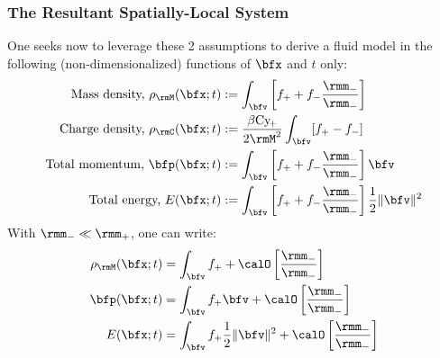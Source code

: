 \subsubsection*{The Resultant Spatially-Local System}
    One seeks now to leverage these 2 assumptions to derive a fluid model in the following (non-dimensionalized) functions of $\bfx$ and $t$ only:
    \begin{align}
        \text{Mass density, }   \rho_{\rmM}(\bfx; t)  &:=  \int_{\bfv}\left[f_{+} + f_{-}\frac{\rmm_{-}}{\rmm_{-}}\right]  \\
        \text{Charge density, } \rho_{\rmC}(\bfx; t)  &:=  \frac{\beta\rmCy\!_{+}}{2\rmM^{2}}\int_{\bfv}[f_{+} - f_{-}]  \\
        \text{Total momentum, }        \bfp(\bfx; t)  &:=  \int_{\bfv}\left[f_{+} + f_{-}\frac{\rmm_{-}}{\rmm_{-}}\right]\bfv  \\
        \text{Total energy, }             E(\bfx; t)  &:=  \int_{\bfv}\left[f_{+} + f_{-}\frac{\rmm_{-}}{\rmm_{-}}\right]\frac{1}{2}\|\bfv\|^{2}
    \end{align}
    With $\rmm_{-} \ll \rmm_{+}$, one can write:
    \begin{align}
      \rho_{\rmM}(\bfx; t)  &=  \int_{\bfv}f_{+} + \calO\left[\frac{\rmm_{-}}{\rmm_{-}}\right]  \\
             \bfp(\bfx; t)  &=  \int_{\bfv}f_{+}\bfv + \calO\left[\frac{\rmm_{-}}{\rmm_{-}}\right]  \\
                E(\bfx; t)  &=  \int_{\bfv}f_{+}\frac{1}{2}\|\bfv\|^{2} + \calO\left[\frac{\rmm_{-}}{\rmm_{-}}\right]
    \end{align}
    
